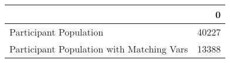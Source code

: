 \begin{tabular}{lr}
\toprule
{} &      0 \\
\midrule
Participant Population                    &  40227 \\
Participant Population with Matching Vars &  13388 \\
\bottomrule
\end{tabular}
